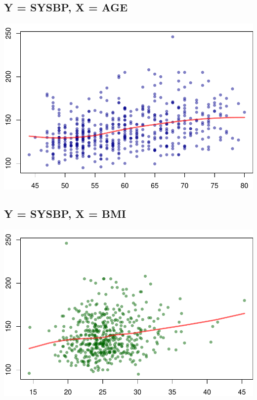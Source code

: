 \documentclass{article}
\begin{document}
\subsection*{Y = SYSBP, X = AGE}
\begin{center}
\includegraphics{ass1-006}
\end{center}

\subsection*{Y = SYSBP, X = BMI}
\begin{center}
\includegraphics{ass1-007}
\end{center}
\end{document}
